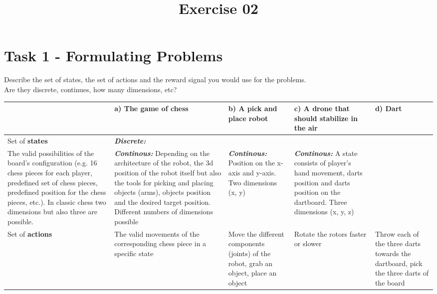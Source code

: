 \documentclass[a4paper]{article}
\date{}
\author{}
\title{\textbf{Exercise 02}}
\begin{document}
	\maketitle 
	\thispagestyle{fancy}
	
    \section*{Task 1 - Formulating Problems}
    Describe the set of states, the set of actions and the reward signal you would use for the problems.\\
    Are they discrete, continues, how many dimensions, etc?
    \newline
    \newline
    \begin{tabularx}{\textwidth} { 
    		 >{\centering}X 
    		| >{\raggedright}X 
    		| >{\raggedright\arraybackslash}X
    		| >{\raggedright\arraybackslash}X 
    		| >{\raggedright\arraybackslash}X}
    	\hline
    	 & \vspace{2pt} a) The game of chess & \vspace{2pt} b) A pick and place robot & \vspace{2pt} c) A drone that should stabilize in the air & \vspace{2pt} d) Dart \\
    	\hline
    	\vspace{2pt} Set of \textbf{states}   & \vspace{2pt} \textbf{\textit{Discrete:}} \\ The valid possibilities of the board's configuration (e.g. 16 chess pieces for each player, predefined set of chess pieces, predefined position for the chess pieces, etc.). In classic chess two dimensions but also three are possible.   & \vspace{2pt} \textbf{\textit{Continous:}} Depending on the architecture of the robot, the 3d position of the robot itself but also the tools for picking and placing objects (arms), objects position and the desired target position. Different numbers of dimensions possible  & \vspace{2pt} \textbf{\textit{Continous:}} Position on the x-axis and y-axis. Two dimensions (x, y)    & \vspace{2pt} \textbf{\textit{Continous:}} A state consists of player's hand movement, darts position and darts position on the dartboard. Three dimensions (x, y, z)  \\
    	\hline
		\vspace{2pt} Set of \textbf{actions}  & \vspace{2pt} The valid movements of the corresponding chess  piece in a specific state  & \vspace{2pt} Move the different components (joints) of the robot, grab an object, place an object & \vspace{2pt} Rotate the rotors faster or slower & \vspace{2pt} Throw each of the three darts towards the dartboard, pick the three darts of the board   \\

\end{tabularx}
\end{document}
